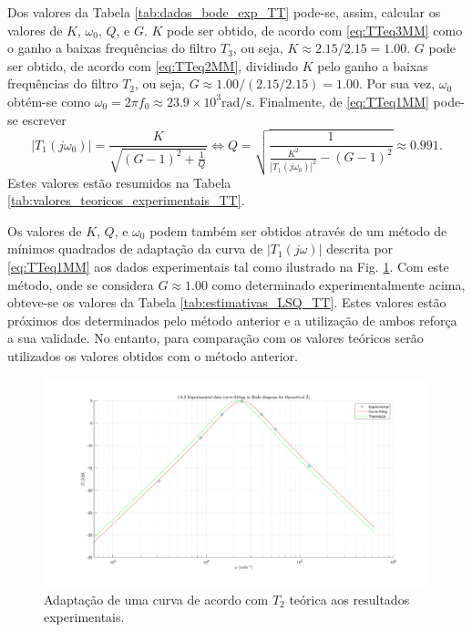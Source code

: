 Dos valores da Tabela \ref{tab:dados_bode_exp_TT} pode-se, assim, calcular os valores de $K$, $\omega_0$, $Q$, e $G$. $K$ pode ser obtido, de acordo com \eqref{eq:TTeq3MM} como o ganho a baixas frequências do filtro $T_3$, ou seja, $K \approx 2.15/2.15 = 1.00$. $G$ pode ser obtido, de acordo com \eqref{eq:TTeq2MM}, dividindo $K$ pelo ganho a baixas frequências do filtro $T_2$, ou seja, $G \approx 1.00/(2.15/2.15) = 1.00$. Por sua vez, $\omega_0$ obtém-se como $\omega_0 = 2 \pi f_0 \approx 23.9 \times 10^3 \si{\radian\per\second}$. Finalmente, de \eqref{eq:TTeq1MM} pode-se escrever
\begin{equation*}
    \left |T_1 (j \omega_0) \right| = \frac{K}{\sqrt{(G-1)^2 + \frac{1}{Q}}} \Leftrightarrow Q = \sqrt{\frac{1}{\frac{K^2}{\left |T_1 (j \omega_0) \right|^2} - (G-1)^2}} \approx 0.991.
\end{equation*}
Estes valores estão resumidos na Tabela \ref{tab:valores_teoricos_experimentais_TT}.

Os valores de $K$, $Q$, e $\omega_0$ podem também ser obtidos através de um método de mínimos quadrados de adaptação da curva de $\left |T_1 (j\omega)\right|$ descrita por \eqref{eq:TTeq1MM} aos dados experimentais tal como ilustrado na Fig. \ref{fig:adaptacao}. Com este método, onde se considera $G \approx 1.00$ como determinado experimentalmente acima, obteve-se os valores da Tabela \ref{tab:estimativas_LSQ_TT}. Estes valores estão próximos dos determinados pelo método anterior e a utilização de ambos reforça a sua validade. No entanto, para comparação com os valores teóricos serão utilizados os valores obtidos com o método anterior.

\begin{figure}[ht]
    \centering
    \includegraphics[width=\linewidth]{Imagens/adaptacao_bode_experimental_T1.pdf}
    \caption{Adaptação de uma curva de acordo com $T_2$ teórica aos resultados experimentais.}
    \label{fig:adaptacao}
\end{figure}

